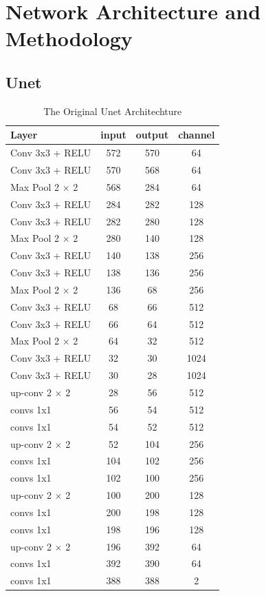 \section{Network Architecture and Methodology}
\subsection{Unet}
\begin{table}
\centering
	\begin{tabular}{l c c c}
	\hline
	\hline
	Layer	&	input	&	output	&	channel	\\
	\hline
	Conv 3x3 + RELU	&	572	&	570	&	64	\\
	Conv 3x3 + RELU	&	570	&	568	&	64	\\
	Max Pool 2 $\times$ 2	&	568	&	284	&	64	\\
	Conv 3x3 + RELU	&	284	&	282	&	128	\\
	Conv 3x3 + RELU	&	282	&	280	&	128	\\
	Max Pool 2 $\times$ 2	&	280	&	140	&	128	\\
	Conv 3x3 + RELU	&	140	&	138	&	256	\\
	Conv 3x3 + RELU	&	138	&	136	&	256	\\
	Max Pool 2 $\times$ 2	&	136	&	68	&	256	\\
	Conv 3x3 + RELU	&	68	&	66	&	512	\\
	Conv 3x3 + RELU	&	66	&	64	&	512	\\
	Max Pool 2 $\times$ 2	&	64	&	32	&	512	\\
	Conv 3x3 + RELU	&	32	&	30	&	1024	\\
	Conv 3x3 + RELU	&	30	&	28	&	1024	\\
	up-conv 2 $\times$ 2	&	28	&	56	&	512	\\
	convs 1x1	&	56	&	54	&	512	\\
	convs 1x1	&	54	&	52	&	512	\\
	up-conv 2 $\times$ 2	&	52	&	104	&	256	\\
	convs 1x1	&	104	&	102	&	256	\\
	convs 1x1	&	102	&	100	&	256	\\
	up-conv 2 $\times$ 2	&	100	&	200	&	128	\\
	convs 1x1	&	200	&	198	&	128	\\
	convs 1x1	&	198	&	196	&	128	\\
	up-conv 2 $\times$ 2	&	196	&	392	&	64	\\
	convs 1x1	&	392	&	390	&	64	\\
	convs 1x1	&	388	&	388	&	2	\\
	\hline
	\hline
	\end{tabular}
	\caption{The Original Unet Architechture}
	\label{tab:OriginalUnet}
\end{table}
